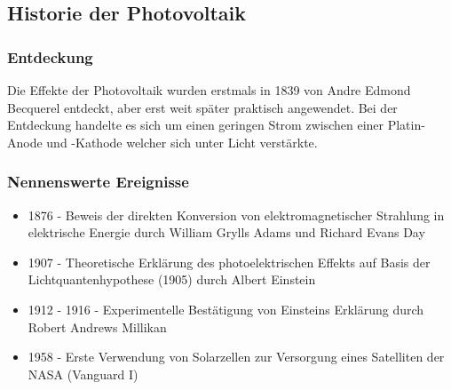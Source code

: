 \subsection{Historie der Photovoltaik}
    \subsubsection{Entdeckung}
        Die Effekte der Photovoltaik wurden erstmals in 1839 von Andre
        Edmond Becquerel entdeckt, aber erst weit später praktisch
        angewendet. Bei der Entdeckung handelte es sich um einen geringen
        Strom zwischen einer Platin-Anode und -Kathode welcher sich unter
        Licht verstärkte. \cite{Wiki_PhotovoltaicHistory}

    \subsubsection{Nennenswerte Ereignisse}
        \begin{itemize}
            \item 1876 - Beweis der direkten Konversion von
                elektromagnetischer Strahlung in elektrische Energie durch
                William Grylls Adams und Richard Evans Day
            \item 1907 - Theoretische Erklärung des photoelektrischen Effekts
                auf Basis der Lichtquantenhypothese (1905) durch Albert
                Einstein
            \item 1912 - 1916 - Experimentelle Bestätigung von Einsteins
                Erklärung durch Robert Andrews Millikan
            \item 1958 - Erste Verwendung von Solarzellen zur Versorgung
                eines Satelliten der NASA (Vanguard I) \cite{Wiki_Vanguard}
        \end{itemize}